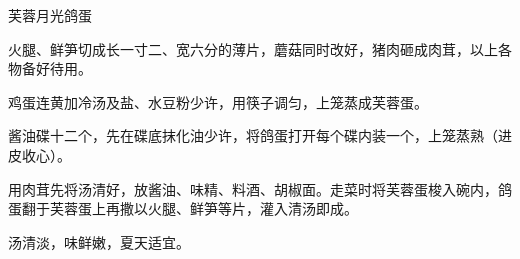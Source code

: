 %
%
%
%
%
%
%
\begin{recipe}{芙蓉月光鸽蛋}

\ingredients


\preparation

\step 火腿、鲜笋切成长一寸二、宽六分的薄片，蘑菇同时改好，猪肉砸成肉茸，以上各
物备好待用。

\step 鸡蛋连黄加冷汤及盐、水豆粉少许，用筷子调匀，上笼蒸成芙蓉蛋。

\step 酱油碟十二个，先在碟底抹化油少许，将鸽蛋打开每个碟内装一个，上笼蒸熟（进
皮收心）。

\step 用肉茸先将汤清好，放酱油、味精、料酒、胡椒面。走菜时将芙蓉蛋梭入碗内，鸽
蛋翻于芙蓉蛋上再撒以火腿、鲜笋等片，灌入清汤即成。

\features

汤清淡，味鲜嫩，夏天适宜。

\end{recipe}

